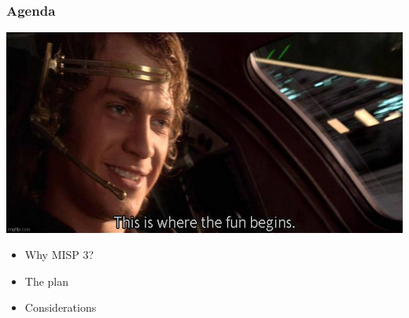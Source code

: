 \begin{frame}
    \frametitle{Agenda}
    \vspace{-3em}
    \begin{center}
        \includegraphics[width=0.65\linewidth]{pictures/fun-begin.jpeg}
    \end{center}
    \begin{itemize}
        \item Why MISP 3?
        \item The plan
        \item Considerations
    \end{itemize}
\end{frame}

